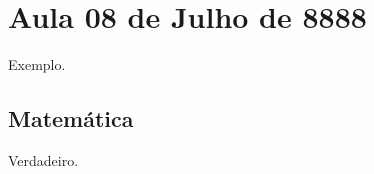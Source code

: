\section{Aula 08 de Julho de 8888}
\label{8888_07_08}

Exemplo.

\subsection{Matemática}

\begin{teorema}
Verdadeiro.
\end{teorema}
